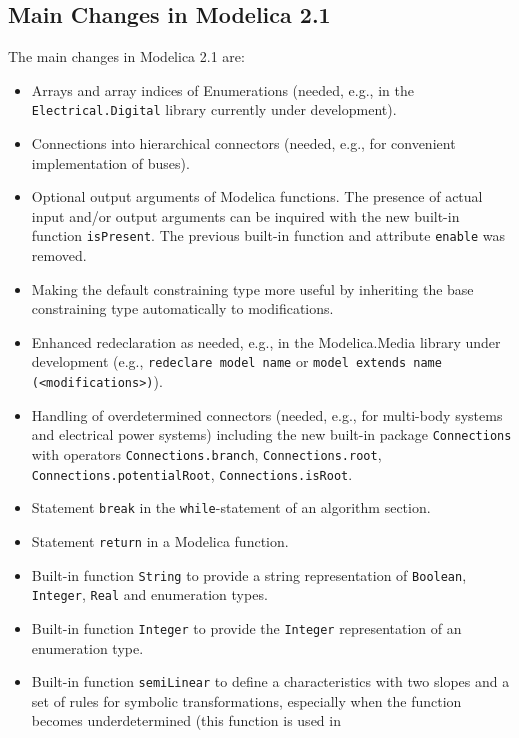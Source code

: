 \subsection{Main Changes in Modelica 2.1}\label{main-changes-in-modelica-2-1}

The main changes in Modelica 2.1 are:
\begin{itemize}
\item
  Arrays and array indices of Enumerations (needed, e.g., in the
  \lstinline!Electrical.Digital! library currently under development).
\item
  Connections into hierarchical connectors (needed, e.g., for convenient
  implementation of buses).
\item
  Optional output arguments of Modelica functions. The presence of
  actual input and/or output arguments can be inquired with the new
  built-in function \lstinline!isPresent!. The previous built-in function and
  attribute \lstinline!enable! was removed.
\item
  Making the default constraining type more useful by inheriting the
  base constraining type automatically to modifications.
\item
  Enhanced redeclaration as needed, e.g., in the Modelica.Media library
  under development (e.g., \lstinline!redeclare model name! or \lstinline!model extends name (<modifications>)!).
\item
  Handling of overdetermined connectors (needed, e.g., for multi-body
  systems and electrical power systems) including the new built-in
  package \lstinline!Connections! with operators \lstinline!Connections.branch!,
  \lstinline!Connections.root!, \lstinline!Connections.potentialRoot!, \lstinline!Connections.isRoot!.
\item
  Statement \lstinline!break! in the \lstinline!while!-statement of an algorithm section.
\item
  Statement \lstinline!return! in a Modelica function.
\item
  Built-in function \lstinline!String! to provide a string representation of \lstinline!Boolean!, \lstinline!Integer!, \lstinline!Real! and enumeration types.
\item
  Built-in function \lstinline!Integer! to provide the \lstinline!Integer! representation of an enumeration type.
\item
  Built-in function \lstinline!semiLinear! to define a characteristics with two
  slopes and a set of rules for symbolic transformations, especially
  when the function becomes underdetermined (this function is used in

\end{itemize}
